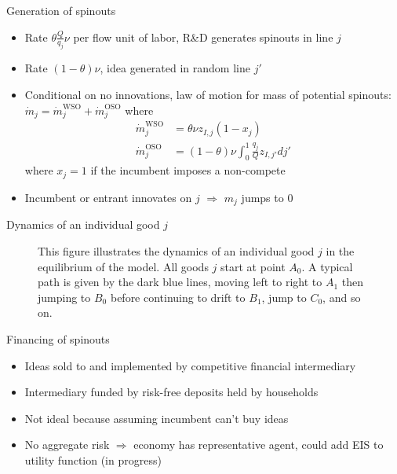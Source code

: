 \documentclass[english,usenames,dvipsnames]{beamer}
\begin{document}
\begin{frame}{Generation of spinouts}
\begin{itemize}
\item Rate $\theta \frac{Q}{q_j} \nu$ per flow unit of labor, R\&D generates spinouts in line $j$
\item Rate $(1-\theta) \nu$, idea generated in random line $j'$
\item Conditional on no innovations, law of motion for mass of potential spinouts: $\dot{m}_j = \dot{m}_j^{\textrm{WSO}} + \dot{m}_j^{\textrm{OSO}}$ where
	\begin{align*}
	\dot{m}_j^{\textrm{WSO}}&= \theta \nu z_{I,j} (1-x_j)\\
	\dot{m}_j^{\textrm{OSO}} &= (1-\theta)\nu \int_0^1 \frac{q_j}{Q} z_{I,j'} dj'
	\end{align*}
where $x_j = 1$ if the incumbent imposes a non-compete
\item Incumbent or entrant innovates on $j$ $\Rightarrow$ $m_j$ jumps to 0
\end{itemize}
\end{frame}


\begin{frame}{Dynamics of an individual good $j$}
\begin{figure}
	\centering
	\resizebox{!}{.6\textheight}{}
	\caption{\scriptsize This figure illustrates the dynamics of an individual good $j$ in the equilibrium of the model. All goods $j$ start at point $A_0$. A typical path is given by the dark blue lines, moving left to right to $A_1$ then jumping to $B_0$ before continuing to drift to $B_1$, jump to $C_0$, and so on.}
	\label{individual_product_line_dynamics}
\end{figure}
\end{frame}

\begin{frame}{Financing of spinouts}
\begin{itemize}
	\item Ideas sold to and implemented by competitive financial intermediary
	\item Intermediary funded by risk-free deposits held by households
	\item Not ideal because assuming incumbent can't buy ideas 
	\item No aggregate risk $\Rightarrow$ economy has representative agent, could add EIS to utility function (in progress)
\end{itemize}
\end{frame}
\end{document}
